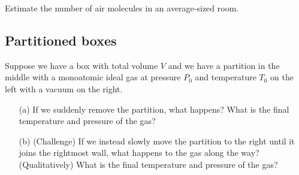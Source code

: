 \documentclass{article}
\begin{document}
Estimate the number of air molecules in an average-sized room.

\subsection{Partitioned boxes}

Suppose we have a box with total volume $V$ and we have a partition in the middle with a monoatomic ideal gas at pressure $P_0$ and temperature $T_0$ on the left with a vacuum on the right.
\begin{itemize}
	\item[(a)] If we suddenly remove the partition, what happens? What is the final temperature and pressure of the gas?
	\item[(b)] (Challenge) If we instead slowly move the partition to the right until it joins the rightmost wall, what happens to the gas along the way? (Qualitatively) What is the final temperature and pressure of the gas?
\end{itemize}
\end{document}
